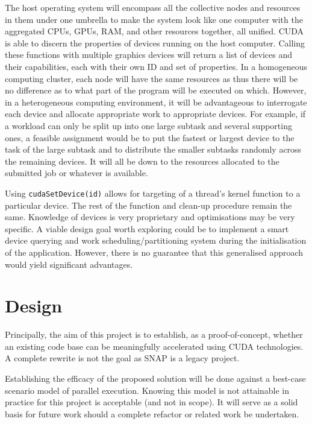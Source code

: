 \documentclass[conference]{IEEEtran}
\begin{document}
The host operating system will encompass all the collective nodes and resources in them under one umbrella to make the system look like one computer with the aggregated CPUs, GPUs, RAM, and other resources together, all unified. CUDA is able to discern the properties of devices running on the host computer. Calling these functions with multiple graphics devices will return a list of devices and their capabilities, each with their own ID and set of properties. In a homogeneous computing cluster, each node will have the same resources as thus there will be no difference as to what part of the program will be executed on which. However, in a heterogeneous computing environment, it will be advantageous to interrogate each device and allocate appropriate work to appropriate devices. For example, if a workload can only be split up into one large subtask and several supporting ones, a feasible assignment would be to put the fastest or largest device to the task of the large subtask and to distribute the smaller subtasks randomly across the remaining devices. It will all be down to the resources allocated to the submitted job or whatever is available.

Using \texttt{cudaSetDevice(id)} allows for targeting of a thread's kernel function to a particular device. The rest of the function and clean-up procedure remain the same. Knowledge of devices is very proprietary and optimisations may be very specific. A viable design goal worth exploring could be to implement a smart device querying and work scheduling/partitioning system during the initialisation of the application. However, there is no guarantee that this generalised approach would yield significant advantages.



\section{Design}
\label{sec:design}

Principally, the aim of this project is to establish, as a proof-of-concept, whether an existing code base can be meaningfully accelerated using CUDA technologies. A complete rewrite is not the goal as SNAP is a legacy project.

Establishing the efficacy of the proposed solution will be done against a best-case scenario model of parallel execution. Knowing this model is not attainable in practice for this project is acceptable (and not in scope). It will serve as a solid basis for future work should a complete refactor or related work be undertaken.
\end{document}

